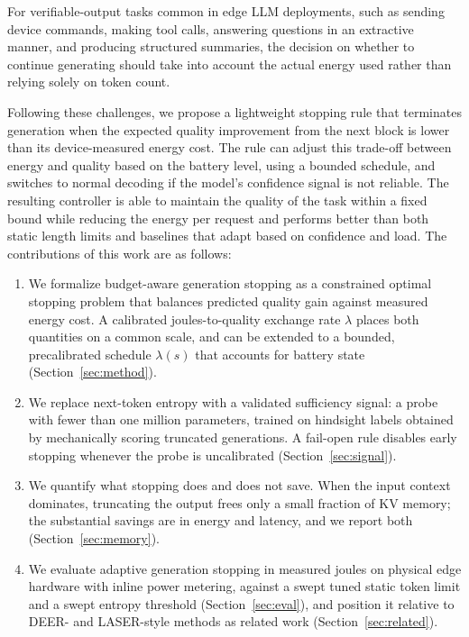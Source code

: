 \documentclass[review,12pt]{elsarticle}
\begin{document}
For verifiable-output tasks common in edge LLM deployments, such as sending device commands, making tool calls, answering questions in an extractive manner, and producing structured summaries, the decision on whether to continue generating should take into account the actual energy used rather than relying solely on token count. 

Following these challenges, we propose a lightweight stopping rule that terminates generation when the expected quality improvement from the next block is lower than its device-measured energy cost. The rule can adjust this trade-off between energy and quality based on
the battery level, using a bounded schedule, and switches to normal
decoding if the model's confidence signal is not reliable. The resulting controller is able to maintain the quality of the task within a fixed bound while reducing the energy per request and performs better than both static length limits and baselines that adapt based on confidence and load. The contributions of this work are as follows: 
\begin{enumerate}
\item We formalize budget-aware generation stopping as a constrained
optimal stopping problem that balances predicted quality gain against
measured energy cost. A calibrated joules-to-quality exchange rate
$\lambda$ places both quantities on a common scale, and can be extended
to a bounded, precalibrated schedule $\lambda(s)$ that accounts for
battery state (Section~\ref{sec:method}).
\item We replace next-token entropy with a validated sufficiency signal:
a probe with fewer than one million parameters, trained on hindsight labels
obtained by mechanically scoring truncated generations. A fail-open rule
disables early stopping whenever the probe is uncalibrated
(Section~\ref{sec:signal}).
\item We quantify what stopping does and does not save. When the input
context dominates, truncating the output frees only a small fraction of KV
memory; the substantial savings are in energy and latency, and we report
both (Section~\ref{sec:memory}).
\item We evaluate adaptive generation stopping in measured joules on
physical edge hardware with inline power metering, against a swept
tuned static token limit and a swept entropy threshold
(Section~\ref{sec:eval}), and position it relative to DEER- and
LASER-style methods as related work (Section~\ref{sec:related}).
\end{enumerate}
\end{document}
